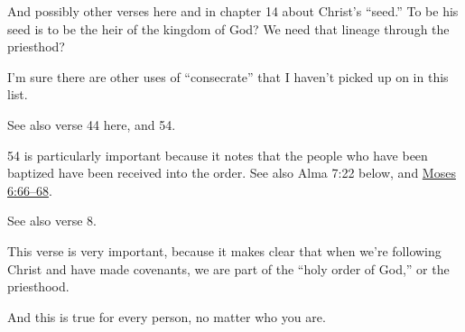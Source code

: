 \begin{compactdesc}
				\begin{compactitem}
					\item And possibly other verses here and in chapter 14 about Christ's ``seed.'' To be his seed is to be the heir of the kingdom of God? We need that lineage through the priesthod?
				\end{compactitem}
			\item[{\hyperref[MOSIAH-23-17]{Mosiah 23:17}}] \phantom{.}
				\begin{compactitem}
					\item I'm sure there are other uses of ``consecrate'' that I haven't picked up on in this list.
				\end{compactitem}
			\item[{\hyperref[MOSIAH-29-19]{Mosiah 29:19--20}}] \phantom{.}
			\item[{\hyperref[ALMA-4-20]{Alma 4:20}}]
			\item[{\hyperref[ALMA-5-49]{Alma 5:49}}] \phantom{.}
				\begin{compactitem}
					\item See also verse 44 here, and 54.
					\item 54 is particularly important because it notes that the people who have been baptized have been received into the order. See also Alma 7:22 below, and \hyperref[MOSES-6-66]{Moses 6:66--68}.
				\end{compactitem}
			\item[{\hyperref[ALMA-6-1]{Alma 6:1}}] \phantom{.}
				\begin{compactitem}
					\item See also verse 8.
				\end{compactitem}
			\item[{\hyperref[ALMA-7-22]{Alma 7:22}}] \phantom{.}
				\begin{compactitem}
					\item This verse is very important, because it makes clear that when we're following Christ and have made covenants, we are part of the ``holy order of God,'' or the priesthood.
					\item And this is true for every person, no matter who you are.
				\end{compactitem}
			\item[{\hyperref[ALMA-8-4]{Alma 8:4}}]
			\item[{\hyperref[ALMA-8-24]{Alma 8:24}}]
			\item[{\hyperref[ALMA-8-31]{Alma 8:31--32}}] 
			\item[{\hyperref[ALMA-13]{Alma 13}}] \phantom{.}

\end{compactdesc}

